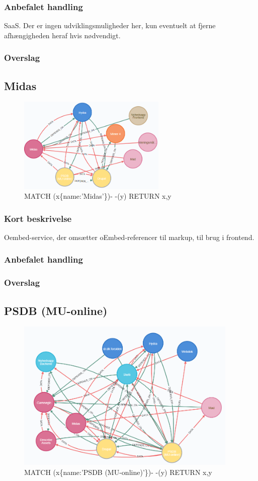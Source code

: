 \documentclass{article}
\begin{document}
\subsubsection{Anbefalet handling}
SaaS. Der er ingen udviklingsmuligheder her, kun eventuelt at fjerne afhængigheden heraf hvis nødvendigt.
\subsubsection{Overslag}


\subsection{Midas}
\begin{figure}[h]
\includegraphics[width=200pt]{Midas.PNG}
\caption{MATCH (x\{name:'Midas'\})- -(y) RETURN x,y}
\end{figure}
\subsubsection{Kort beskrivelse}
Oembed-service, der omsætter oEmbed-referencer til markup, til brug i frontend.
\subsubsection{Anbefalet handling}
\subsubsection{Overslag}


\subsection{PSDB (MU-online)}
\begin{figure}[h]
\includegraphics[width=300pt]{PSDB.PNG}
\caption{MATCH (x\{name:'PSDB (MU-online)'\})- -(y) RETURN x,y}
\end{figure}
\end{document}
